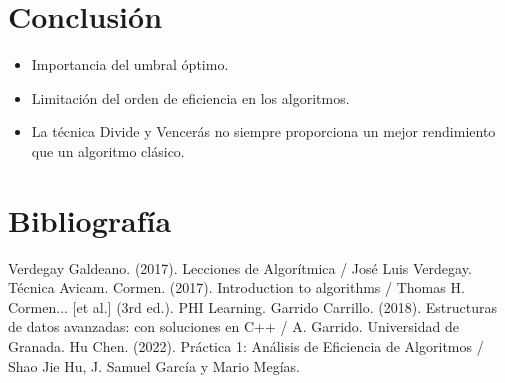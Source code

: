 \documentclass[13pt]{beamer}
\begin{document}

    \section{Conclusión}

    \begin{frame}
        \begin{itemize}
            \item Importancia del umbral óptimo.
            \item Limitación del orden de eficiencia en los algoritmos.
            \item La técnica Divide y Vencerás no siempre proporciona un mejor rendimiento que un algoritmo clásico. 
        \end{itemize}
    \end{frame}


    \section{Bibliografía}

    \begin{frame}
        \begin{thebibliography}{0}
             Verdegay Galdeano. (2017). Lecciones de Algorítmica / José Luis Verdegay. Técnica Avicam.
             Cormen. (2017). Introduction to algorithms / Thomas H. Cormen... [et al.] (3rd ed.). PHI Learning.
             Garrido Carrillo. (2018). Estructuras de datos avanzadas: con soluciones en C++ / A. Garrido. Universidad de Granada.        
             Hu Chen. (2022). Práctica 1: Análisis de Eficiencia de Algoritmos / Shao Jie Hu, J. Samuel García y Mario Megías.      
        \end{thebibliography}
    \end{frame}
\end{document}
